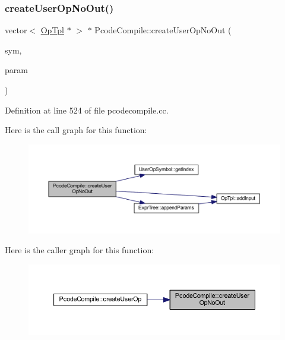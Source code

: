 \subsubsection{\texorpdfstring{createUserOpNoOut()}{createUserOpNoOut()}}
{\footnotesize\ttfamily vector$<$ \mbox{\hyperlink{class_op_tpl}{Op\+Tpl}} $\ast$ $>$ $\ast$ Pcode\+Compile\+::create\+User\+Op\+No\+Out (\begin{DoxyParamCaption}\item[{\mbox{\hyperlink{class_user_op_symbol}{User\+Op\+Symbol}} $\ast$}]{sym,  }\item[{vector$<$ \mbox{\hyperlink{class_expr_tree}{Expr\+Tree}} $\ast$ $>$ $\ast$}]{param }\end{DoxyParamCaption})}



Definition at line 524 of file pcodecompile.\+cc.

Here is the call graph for this function\+:
\nopagebreak
\begin{figure}[H]
\begin{center}
\leavevmode
\includegraphics[width=350pt]{class_pcode_compile_ac76e5f48d5549b256163fa382b979462_cgraph}
\end{center}
\end{figure}
Here is the caller graph for this function\+:
\nopagebreak
\begin{figure}[H]
\begin{center}
\leavevmode
\includegraphics[width=350pt]{class_pcode_compile_ac76e5f48d5549b256163fa382b979462_icgraph}
\end{center}
\end{figure}
\mbox{\label{class_pcode_compile_aef3dea1541f9dc0c120ac7f232c0e078}} 
